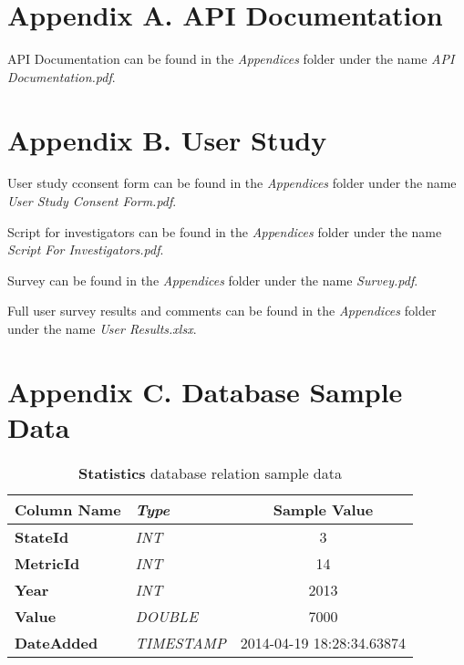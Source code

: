 \begin{appendices}

	\chapter{Appendix A. API Documentation} \label{app:apidoc}

		API Documentation can be found in the \emph{Appendices} folder under the
		name \emph{API Documentation.pdf}.

	\chapter{Appendix B. User Study} \label{app:userstudydocs}

		User study cconsent form can be found in the \emph{Appendices} folder 
		under the name \emph{User Study Consent Form.pdf}.
		
		Script for investigators can be found in the \emph{Appendices} folder 
		under the name \emph{Script For Investigators.pdf}.

		Survey can be found in the \emph{Appendices} folder under the name 
		\emph{Survey.pdf}.
		
		Full user survey results and comments can be found in the 
		\emph{Appendices} folder under the name \emph{User Results.xlsx}.

	\chapter{Appendix C. Database Sample Data} \label{app:dbsample}

		\begin{table}[h]
			\centering
			\begin{tabularx}{\textwidth}{@{} >{\bf}Y >{\em}l c @{}} %
				\toprule
				Column Name	& Type		& Sample Value				\\
				\midrule
				
				StateId		& INT		& 3							\\
				MetricId	& INT		& 14						\\
				Year		& INT		& 2013						\\
				Value		& DOUBLE	& 7000						\\
				DateAdded	& TIMESTAMP	& 2014-04-19 18:28:34.63874	\\
				
				\bottomrule
			\end{tabularx}
			\caption{\textbf{Statistics} database relation sample data}
			\label{tbl:statstable}
		\end{table}
		

\end{appendices}
